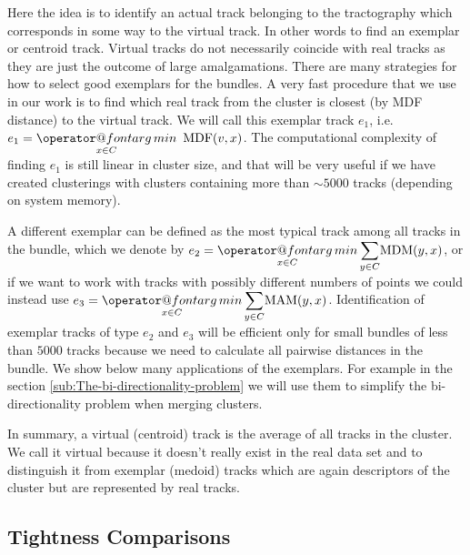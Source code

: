 \documentclass[preprint,authoryear,a4paper,10pt,onecolumn]{elsarticle}
\makeatletter
\def\argmin{\mathop{\operator@font arg\,min}}
\makeatother
\begin{document}
Here the idea is to identify an actual track belonging to the
tractography which corresponds in some way to the virtual track. In
other words to find an exemplar or centroid track. Virtual tracks do not
necessarily coincide with real tracks as they are just the outcome of
large amalgamations. There are many strategies for how to select good
exemplars for the bundles. A very fast procedure that we use in our
work is to find which real track from the cluster is closest (by MDF
distance) to the virtual track. We will call this exemplar track $e_{1}$,
i.e.~$e_{1}={\displaystyle \argmin_{x\in C}}\textrm{\,\ MDF}(v,x)$.
The computational complexity of finding $e_{1}$ is still linear in
cluster size, and that will be very useful if we have created
clusterings with clusters containing more than $\sim5000$ tracks
(depending on system memory).

A different exemplar can be defined as the most typical track among all
tracks in the bundle, which we denote by $e_{2}={\displaystyle
  \argmin_{x\in C}}\,{\displaystyle \sum_{y\in C}}\mathrm{MDM}(y,x)$, or
if we want to work with tracks with possibly different numbers of points
we could instead use $e_{3}={\displaystyle \argmin_{x\in
    C}}\,{\displaystyle \sum_{y\in C}}\mathrm{MAM}(y,x)$.
Identification of exemplar tracks of type $e_{2}$ and $e_{3}$ will be
efficient only for small bundles of less than $5000$ tracks because we
need to calculate all pairwise distances in the bundle. We show below
many applications of the exemplars. For example in the section
\ref{sub:The-bi-directionality-problem} we will use them to simplify the
bi-directionality problem when merging clusters.

In summary, a virtual (centroid) track is the average of all tracks in
the cluster. We call it virtual because it doesn't really exist in the
real data set and to distinguish it from exemplar (medoid) tracks which
are again descriptors of the cluster but are represented by real tracks.

\subsection{Tightness Comparisons\label{sub:Tightness-comparisons-1}}
\end{document}
